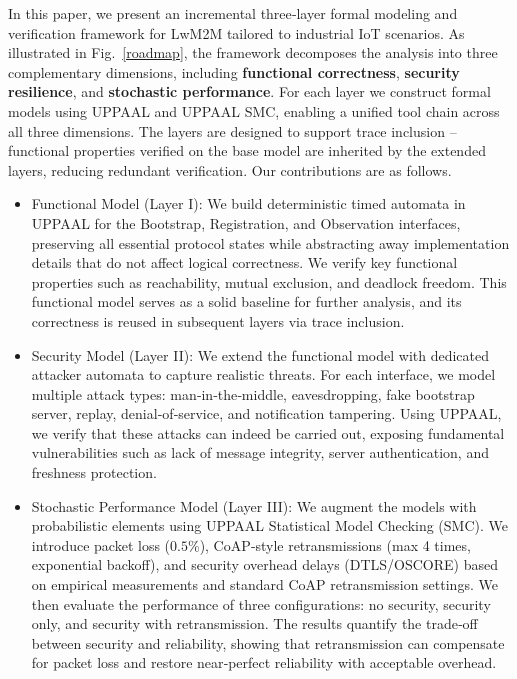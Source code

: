 \documentclass[a4paper,fleqn]{cas-sc}
\begin{document}
In this paper, we present an incremental three‑layer formal modeling and verification framework for LwM2M tailored to industrial IoT scenarios. As illustrated in Fig.~\ref{roadmap}, the framework decomposes the analysis into three complementary dimensions, including \textbf{functional correctness}, \textbf{security resilience}, and \textbf{stochastic performance}. For each layer we construct formal models using UPPAAL and UPPAAL SMC, enabling a unified tool chain across all three dimensions.  The layers are designed to support trace inclusion – functional properties verified on the base model are inherited by the extended layers, reducing redundant verification.  Our contributions are as follows.

\begin{itemize}
    \item Functional Model (Layer I): We build deterministic timed automata in UPPAAL for the Bootstrap, Registration, and Observation interfaces, preserving all essential protocol states while abstracting away implementation details that do not affect logical correctness. We verify key functional properties such as reachability, mutual exclusion, and deadlock freedom. This functional model serves as a solid baseline for further analysis, and its correctness is reused in subsequent layers via trace inclusion.
    \item Security Model (Layer II): We extend the functional model with dedicated attacker automata to capture realistic threats. For each interface, we model multiple attack types: man‑in‑the‑middle, eavesdropping, fake bootstrap server, replay, denial‑of‑service, and notification tampering. Using UPPAAL, we verify that these attacks can indeed be carried out, exposing fundamental vulnerabilities such as lack of message integrity, server authentication, and freshness protection.
    \item Stochastic Performance Model (Layer III): We augment the models with probabilistic elements using UPPAAL Statistical Model Checking (SMC). We introduce packet loss ($0.5\%$), CoAP‑style retransmissions (max 4 times, exponential backoff), and security overhead delays (DTLS/OSCORE) based on empirical measurements and standard CoAP retransmission settings. We then evaluate the performance of three configurations: no security, security only, and security with retransmission. The results quantify the trade‑off between security and reliability, showing that retransmission can compensate for packet loss and restore near‑perfect reliability with acceptable overhead.
\end{itemize}
\end{document}
